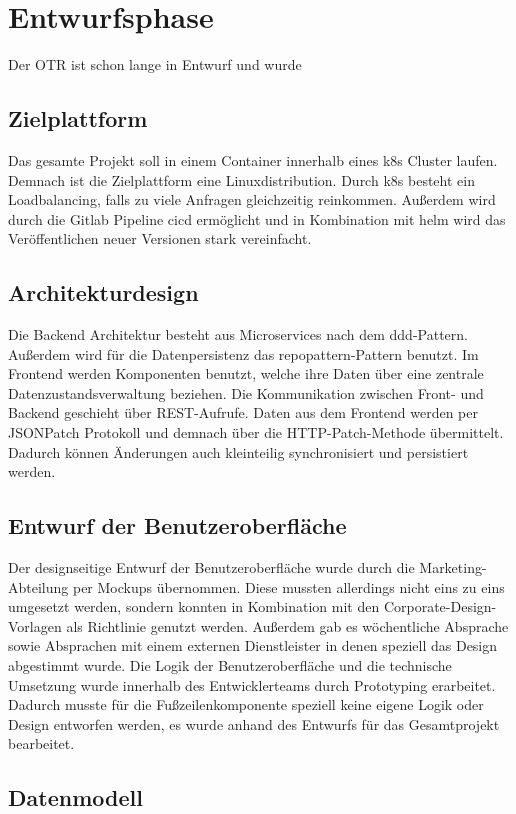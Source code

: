 \newpage
\section{Entwurfsphase}
\label{entwurfsphase}
Der \ac{OTR} ist schon lange in Entwurf und wurde 
\subsection{Zielplattform}
\label{zielplattform}
Das gesamte Projekt soll in einem \gls{Container} innerhalb eines \gls{k8s} Cluster laufen. Demnach ist die Zielplattform eine Linuxdistribution. Durch \gls{k8s} besteht ein Loadbalancing, falls zu viele Anfragen gleichzeitig reinkommen. Außerdem wird durch die Gitlab Pipeline \ac{cicd} ermöglicht und in Kombination mit \gls{helm} wird das Veröffentlichen neuer Versionen stark vereinfacht.
\subsection{Architekturdesign}
\label{architekturdesign}
Die Backend Architektur besteht aus Microservices nach dem \gls{ddd}-Pattern. Außerdem wird für die Datenpersistenz das \gls{repopattern}-Pattern benutzt. Im Frontend werden Komponenten benutzt, welche ihre Daten über eine zentrale Datenzustandsverwaltung beziehen. Die Kommunikation zwischen Front- und Backend geschieht über \gls{REST}-Aufrufe. Daten aus dem Frontend werden per JSONPatch Protokoll und demnach über die HTTP-Patch-Methode übermittelt. Dadurch können Änderungen auch kleinteilig synchronisiert und persistiert werden.
\subsection{Entwurf der Benutzeroberfläche}
\label{benutzeroberfläche}
Der designseitige Entwurf der Benutzeroberfläche wurde durch die Marketing-Abteilung per Mockups übernommen. Diese mussten allerdings nicht eins zu eins umgesetzt werden, sondern konnten in Kombination mit den Corporate-Design-Vorlagen als Richtlinie genutzt werden. Außerdem gab es wöchentliche Absprache sowie Absprachen mit einem externen Dienstleister in denen speziell das Design abgestimmt wurde. Die Logik der Benutzeroberfläche und die technische Umsetzung wurde innerhalb des Entwicklerteams durch Prototyping erarbeitet.\\
Dadurch musste für die Fußzeilenkomponente speziell keine eigene Logik oder Design entworfen werden, es wurde anhand des Entwurfs für das Gesamtprojekt bearbeitet.
\subsection{Datenmodell}
\label{datenmodell}

